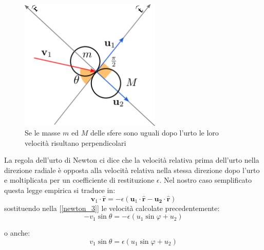 \documentclass[a4paper,10pt,oneside]{article}
\begin{document}
\begin{figure}[h]
 \centering
 \includegraphics[width=0.6\textwidth]{./immagini/sfere_uguali.png}
 \caption{Se le masse $m$ ed $M$ delle sfere sono uguali dopo l'urto le loro velocità risultano perpendicolari}\label{fig:sfere_uguali}
\end{figure}
La regola dell'urto di Newton ci dice che la velocità relativa prima dell'urto nella direzione radiale è opposta alla velocità relativa nella stessa direzione dopo l'urto e moltiplicata per un coefficiente di restituzione $\epsilon$. Nel nostro caso semplificato questa legge empirica si traduce in:
\begin{equation} \label{newton_3}
 \mathbf{v}_1\cdot\hat{\mathbf{r}}=-\epsilon(\mathbf{u}_1\cdot\hat{\mathbf{r}}-\mathbf{u_2}\cdot\hat{\mathbf{r}})
\end{equation}
sostituendo nella [\ref{newton_3}] le velocità calcolate precedentemente:
\begin{equation}
 -v_1\sin\theta=-\epsilon(u_1\sin\varphi+u_2)
\end{equation}

o anche:
\begin{equation}
 v_1\sin\theta=\epsilon(u_1\sin\varphi+u_2)
\end{equation}
\end{document}
